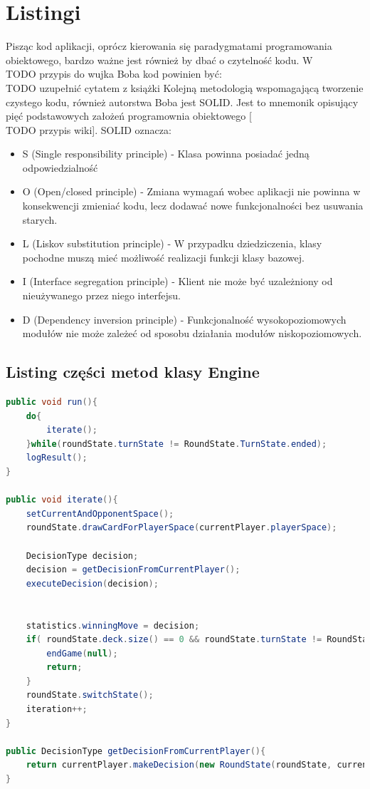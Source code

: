 \section{Listingi}
Pisząc kod aplikacji, oprócz kierowania się paradygmatami programowania obiektowego, bardzo ważne jest również by dbać o czytelność kodu. W \\ TODO przypis do wujka Boba kod powinien być:
\\TODO uzupełnić cytatem z książki
Kolejną metodologią wspomagającą tworzenie czystego kodu, również autorstwa Boba jest SOLID. Jest to mnemonik opisujący pięć podstawowych założeń programownia obiektowego [\\ TODO przypis wiki]. SOLID oznacza:
\begin{itemize}
	\item S (Single responsibility principle) - Klasa powinna posiadać jedną odpowiedzialność
	\item O (Open/closed principle) - Zmiana wymagań wobec aplikacji nie powinna w konsekwencji zmieniać kodu, lecz dodawać nowe funkcjonalności bez usuwania starych.
	\item L (Liskov substitution principle) - W przypadku dziedziczenia, klasy pochodne muszą mieć możliwość realizacji funkcji klasy bazowej.
	\item I (Interface segregation principle) - Klient nie może być uzależniony od nieużywanego przez niego interfejsu.
	\item D (Dependency inversion principle) - Funkcjonalność wysokopoziomowych modułów nie może zależeć od sposobu działania modułów niskopoziomowych.
\end{itemize}

\subsection{Listing części metod klasy Engine}
\begin{lstlisting}[language=java,label=lst:harris_module,caption=Deklaracja modułu detekcji narożników na obrazie metodą Harrisa]
public void run(){
    do{
	    iterate();
    }while(roundState.turnState != RoundState.TurnState.ended);
    logResult();
}
    
public void iterate(){
    setCurrentAndOpponentSpace();
    roundState.drawCardForPlayerSpace(currentPlayer.playerSpace);
    
    DecisionType decision;
    decision = getDecisionFromCurrentPlayer();
    executeDecision(decision);
    
    
    statistics.winningMove = decision;
    if( roundState.deck.size() == 0 && roundState.turnState != RoundState.TurnState.ended){
	    endGame(null);
	    return;
    }
    roundState.switchState();
    iteration++;
}
    
public DecisionType getDecisionFromCurrentPlayer(){
    return currentPlayer.makeDecision(new RoundState(roundState, currentPlayer.playerSpace), DecisionType.getDecisions(currentPlayer.playerSpace.hand));
}
        
\end{lstlisting}


